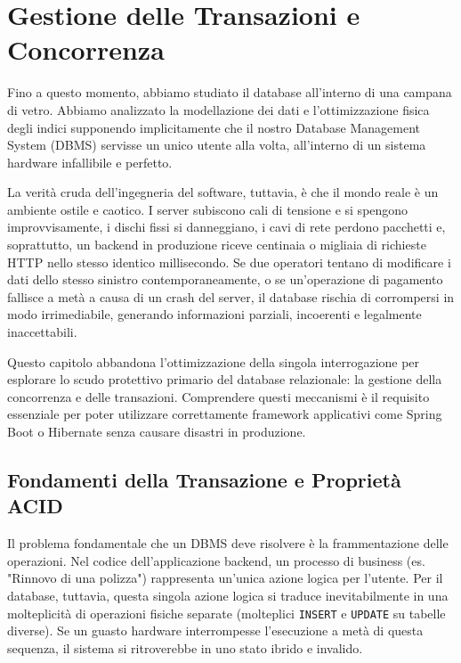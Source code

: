 \chapter{Gestione delle Transazioni e Concorrenza}

Fino a questo momento, abbiamo studiato il database all'interno di una campana di vetro. Abbiamo analizzato la modellazione dei dati e l'ottimizzazione fisica degli indici supponendo implicitamente che il nostro Database Management System (DBMS) servisse un unico utente alla volta, all'interno di un sistema hardware infallibile e perfetto. 

La verità cruda dell'ingegneria del software, tuttavia, è che il mondo reale è un ambiente ostile e caotico. I server subiscono cali di tensione e si spengono improvvisamente, i dischi fissi si danneggiano, i cavi di rete perdono pacchetti e, soprattutto, un backend in produzione riceve centinaia o migliaia di richieste HTTP nello stesso identico millisecondo. 
Se due operatori tentano di modificare i dati dello stesso sinistro contemporaneamente, o se un'operazione di pagamento fallisce a metà a causa di un crash del server, il database rischia di corrompersi in modo irrimediabile, generando informazioni parziali, incoerenti e legalmente inaccettabili.

Questo capitolo abbandona l'ottimizzazione della singola interrogazione per esplorare lo scudo protettivo primario del database relazionale: la gestione della concorrenza e delle transazioni. Comprendere questi meccanismi è il requisito essenziale per poter utilizzare correttamente framework applicativi come Spring Boot o Hibernate senza causare disastri in produzione.

\section{Fondamenti della Transazione e Proprietà ACID}

Il problema fondamentale che un DBMS deve risolvere è la frammentazione delle operazioni. Nel codice dell'applicazione backend, un processo di business (es. "Rinnovo di una polizza") rappresenta un'unica azione logica per l'utente. Per il database, tuttavia, questa singola azione logica si traduce inevitabilmente in una molteplicità di operazioni fisiche separate (molteplici \texttt{INSERT} e \texttt{UPDATE} su tabelle diverse). 
Se un guasto hardware interrompesse l'esecuzione a metà di questa sequenza, il sistema si ritroverebbe in uno stato ibrido e invalido.

